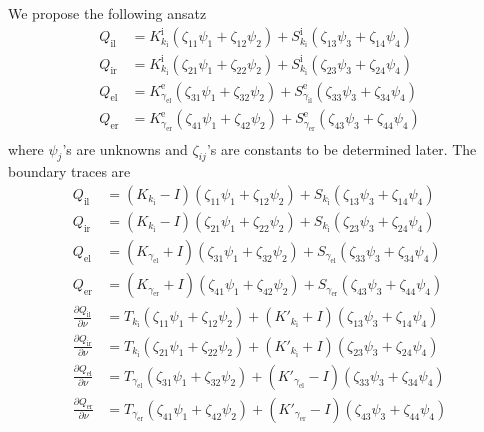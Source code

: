 We propose the following ansatz 
\begin{align*}
  Q_\text{il} &= K_{k_\text{i}}^{\text{i}} (\zeta_{11}\psi_1 + \zeta_{12}\psi_2) + S_{k_\text{i}}^{\text{i}} (\zeta_{13} \psi_3 + \zeta_{14}\psi_4) \\
  Q_\text{ir} &= K_{k_\text{i}}^{\text{i}} (\zeta_{21}\psi_1 + \zeta_{22}\psi_2) + S_{k_\text{i}}^{\text{i}} (\zeta_{23} \psi_3 + \zeta_{24}\psi_4) \\
  Q_\text{el} &= K_{\gamma_\text{el}}^{\text{e}} (\zeta_{31}\psi_1 + \zeta_{32}\psi_2) + S_{\gamma_\text{il}}^{\text{e}} (\zeta_{33} \psi_3 + \zeta_{34}\psi_4) \\
  Q_\text{er} &= K_{\gamma_\text{er}}^{\text{e}} (\zeta_{41}\psi_1 + \zeta_{42}\psi_2) + S_{\gamma_\text{er}}^{\text{e}} (\zeta_{43} \psi_3 + \zeta_{44}\psi_4) \\
\end{align*}
where $\psi_j$'s are unknowns and $\zeta_{ij}$'s are constants to be determined later. The boundary traces are 
\begin{align*}
  Q_\text{il} &= (K_{k_\text{i}}-I) (\zeta_{11}\psi_1 + \zeta_{12}\psi_2) + S_{k_\text{i}} (\zeta_{13} \psi_3 + \zeta_{14}\psi_4) \\
  Q_\text{ir} &= (K_{k_\text{i}}-I) (\zeta_{21}\psi_1 + \zeta_{22}\psi_2) + S_{k_\text{i}} (\zeta_{23} \psi_3 + \zeta_{24}\psi_4) \\
  Q_\text{el} &= (K_{\gamma_\text{el}} + I) (\zeta_{31}\psi_1 + \zeta_{32}\psi_2) + S_{\gamma_\text{el}} (\zeta_{33} \psi_3 + \zeta_{34}\psi_4) \\
  Q_\text{er} &= (K_{\gamma_\text{er}} + I) (\zeta_{41}\psi_1 + \zeta_{42}\psi_2) + S_{\gamma_\text{er}} (\zeta_{43} \psi_3 + \zeta_{44}\psi_4) \\
  \frac{\partial Q_\text{il}}{\partial\nu} &= T_{k_\text{i}} (\zeta_{11}\psi_1 + \zeta_{12}\psi_2) + (K'_{k_\text{i}} + I) (\zeta_{13} \psi_3 + \zeta_{14}\psi_4)\\
  \frac{\partial Q_\text{ir}}{\partial\nu} &= T_{k_\text{i}} (\zeta_{21}\psi_1 + \zeta_{22}\psi_2) + (K'_{k_\text{i}} + I) (\zeta_{23} \psi_3 + \zeta_{24}\psi_4)\\
  \frac{\partial Q_\text{el}}{\partial\nu} &= T_{\gamma_\text{el}} (\zeta_{31}\psi_1 + \zeta_{32}\psi_2) + (K'_{\gamma_\text{el}} - I) (\zeta_{33} \psi_3 + \zeta_{34}\psi_4)\\
  \frac{\partial Q_\text{er}}{\partial\nu} &= T_{\gamma_\text{er}} (\zeta_{41}\psi_1 + \zeta_{42}\psi_2) + (K'_{\gamma_\text{er}} - I) (\zeta_{43} \psi_3 + \zeta_{44}\psi_4)\\
\end{align*}
